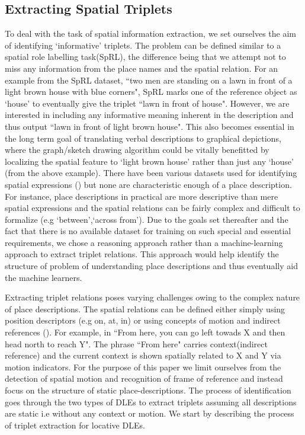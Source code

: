 \documentclass{acm_proc_article-sp}
\begin{document}
\subsection{Extracting Spatial Triplets}
To deal with the task of spatial information extraction, we set ourselves the aim of identifying `informative' triplets. The problem can be defined similar to a spatial role labelling task(SpRL), the difference being that we attempt not to miss any information from the place names and the spatial relation. For an example from the SpRL dataset, ``two men are standing on a lawn in front of a light brown house with blue corners", SpRL marks one of the reference object as `house' to eventually give the triplet ``lawn in front of house". However, we are interested in including any informative meaning inherent in the description and thus output ``lawn in front of light brown house". This also becomes essential in the long term goal of translating verbal descriptions to graphical depictions, where the graph/sketch drawing algorithm could be vitally benefitted by localizing the spatial feature to `light brown house' rather than just any `house' (from the above example). There have been various datasets used for identifying spatial expressions (\cite{Bateman:data,CLEF:data, parisa:semeval})  but none are characteristic enough of a place description. For instance, place descriptions in practical are more descriptive than mere spatial expressions and the spatial relations can be fairly complex and difficult to formalize (e.g `between',`across from').  Due to the goals set thereafter and the fact that there is no available dataset for training on such special and essential requirements, we chose a reasoning approach rather than a machine-learning approach to extract triplet relations. This approach would help identify the structure of  problem of understanding place descriptions and thus eventually aid the machine learners. 

Extracting triplet relations poses varying challenges owing to the complex nature of place descriptions. The spatial relations can be defined either simply using position descriptors (e.g on, at, in) or using concepts of motion and indirect references (\cite{zlatev:semantics}). For example, in ``From here, you can go left towads X and then head north to reach Y". The phrase ``From here" carries context(indirect reference) and the current context is shown spatially related to X and Y via motion indicators. For the purpose of this paper we limit ourselves from the detection of spatial motion and recognition of frame of reference and instead focus on the structure of static place-descriptions. The process of identification goes through the two types of DLEs to extract triplets assuming all descriptions are static i.e without any context or motion. We start by describing the process of triplet extraction for locative DLEs.
\end{document}

